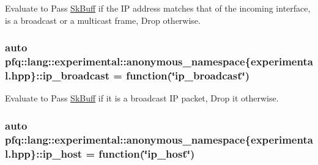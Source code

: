 Evaluate to {\ttfamily Pass} \hyperlink{structpfq_1_1lang_1_1SkBuff}{Sk\+Buff} if the IP address matches that of the incoming interface, is a broadcast or a multicast frame, {\ttfamily Drop} otherwise. 

\subsubsection[{\texorpdfstring{ip\+\_\+broadcast}{ip_broadcast}}]{\setlength{\rightskip}{0pt plus 5cm}auto pfq\+::lang\+::experimental\+::anonymous\+\_\+namespace\{experimental.\+hpp\}\+::ip\+\_\+broadcast = {\bf function}(\char`\"{}ip\+\_\+broadcast\char`\"{})}\hypertarget{namespacepfq_1_1lang_1_1experimental_1_1anonymous__namespace_02experimental_8hpp_03_a5fbdc84e9899dc881ed25e37fbdddabc}{}\label{namespacepfq_1_1lang_1_1experimental_1_1anonymous__namespace_02experimental_8hpp_03_a5fbdc84e9899dc881ed25e37fbdddabc}


Evaluate to {\ttfamily Pass} \hyperlink{structpfq_1_1lang_1_1SkBuff}{Sk\+Buff} if it is a broadcast IP packet, {\ttfamily Drop} it otherwise. 

\subsubsection[{\texorpdfstring{ip\+\_\+host}{ip_host}}]{\setlength{\rightskip}{0pt plus 5cm}auto pfq\+::lang\+::experimental\+::anonymous\+\_\+namespace\{experimental.\+hpp\}\+::ip\+\_\+host = {\bf function}(\char`\"{}ip\+\_\+host\char`\"{})}\hypertarget{namespacepfq_1_1lang_1_1experimental_1_1anonymous__namespace_02experimental_8hpp_03_ab651cc72b27d482a4ae6c415f50780cd}{}\label{namespacepfq_1_1lang_1_1experimental_1_1anonymous__namespace_02experimental_8hpp_03_ab651cc72b27d482a4ae6c415f50780cd}


